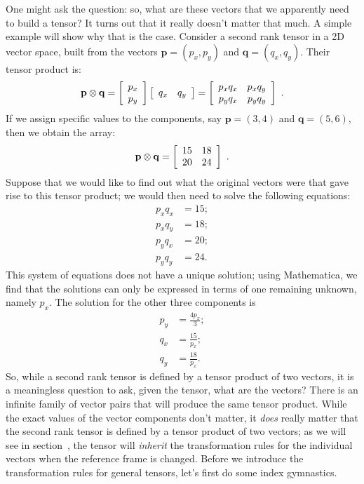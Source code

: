 One might ask the question: so, what are these vectors that we apparently need to build a tensor?  It turns out that it really doesn't matter that much. A simple example will show why that is the case. Consider a second rank tensor in a 2D vector space, built from the vectors $\mathbf{p}=(p_x,p_y)$ and $\mathbf{q}=(q_x,q_y)$.  Their tensor product is:
\begin{equation}
	\mathbf{p}\otimes\mathbf{q} = \columntwo{p_x}{p_y}\rowtwo{q_x}{q_y}=\matrixtwob{p_xq_x}{p_xq_y}{p_yq_x}{p_yq_y}\ .
\end{equation}
If we assign specific values to the components, say $\mathbf{p}=(3,4)$ and $\mathbf{q}=(5,6)$, then we obtain the array:
\begin{equation}
	\mathbf{p}\otimes\mathbf{q} = \left[\begin{array}{rr}15 & 18 \\ 20 & 24 \end{array}\right]\ .
\end{equation}
Suppose that we would like to find out what the original vectors were that gave rise to this tensor product; we would then need to solve the following equations:
\begin{equation}
	\begin{split}
		p_xq_x &= 15;\\
		p_xq_y &= 18;\\
		p_yq_x &= 20;\\
		p_yq_y &= 24.
	\end{split}
\end{equation}
This system of equations does not have a unique solution; using Mathematica, we find that the solutions can only be expressed in terms of one remaining unknown, namely $p_x$. The solution for the other three components is
\begin{equation}
	\begin{split}
		p_y &= \frac{4 p_x}{3};\\
		q_x &= \frac{15}{p_x};\\
		q_y &= \frac{18}{p_x}.
	\end{split}
\end{equation}
So, while a second rank tensor is defined by a tensor product of two vectors, it is a meaningless question to  ask, given the tensor, what are the vectors?  There is an infinite family of vector pairs that will produce the same tensor product.  While the exact values of the vector components don't matter, it \textit{does} really matter that the second rank tensor is defined by a tensor product of two vectors; as we will see in section~, the tensor will \textit{inherit} the transformation rules for the individual vectors when the reference frame is changed.   Before we introduce the transformation rules for general tensors, let's first do some index gymnastics.


